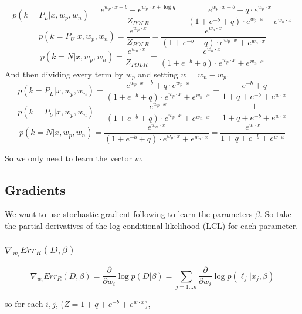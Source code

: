 \documentclass{article}
\begin{document}
$$
p(k=P_L | x, w_p, w_n) =  \frac{e^{w_p \cdot x - b} + e^{w_p \cdot x + \log{q}}}{Z_{POLR}} 
				     = \frac{e^{w_p \cdot x - b} + q \cdot e^{w_p \cdot x}}{(1 + e^{-b} + q) \cdot e^{w_p \cdot x} + e^{w_n \cdot x}} 
$$
$$
p(k=P_U | x, w_p, w_n) =  \frac{e^{w_p \cdot x}}{Z_{POLR}} 
				     = \frac{e^{w_p \cdot x}}{(1 + e^{-b} + q) \cdot e^{w_p \cdot x} + e^{w_n \cdot x}} 
$$
$$
p(k=N | x, w_p, w_n) =  \frac{e^{w_n \cdot x}}{Z_{POLR}} 
				 = \frac{e^{w_n \cdot x}}{(1 + e^{-b} + q) \cdot e^{w_p \cdot x} + e^{w_n \cdot x}} 
$$
And then dividing every term by $w_p$ and setting $w = w_n - w_p$.
$$
p(k=P_L | x, w_p, w_n) = \frac{e^{w_p \cdot x - b} + q \cdot e^{w_p \cdot x}}{(1 + e^{-b} + q) \cdot e^{w_p \cdot x} + e^{w_n \cdot x}} 
 				     = \frac{e^{-b} + q}{1 + q + e^{-b} + e^{w \cdot x}}
$$
$$
p(k=P_U | x, w_p, w_n) = \frac{e^{w_p \cdot x}}{(1 + e^{-b} + q) \cdot e^{w_p \cdot x} + e^{w_n \cdot x}} 
				     = \frac{1}{1 + q + e^{-b} + e^{w \cdot x}}
$$
$$
p(k=N | x, w_p, w_n) = \frac{e^{w_n \cdot x}}{(1 + e^{-b} + q) \cdot e^{w_p \cdot x} + e^{w_n \cdot x}} 
				= \frac{e^{w \cdot x}}{1 + q + e^{-b} + e^{w \cdot x}}
$$


So we only need to learn the vector $w$.

\subsection{Gradients}

We want to use stochastic gradient following to learn the parameters $\beta$. So take the partial derivatives of the log conditional likelihood (LCL) for each parameter.

\subsubsection{$ \nabla_{w_i}{Err_R (D, \beta)}$}

$$
\nabla_{w_i}{Err_R (D, \beta)} = \frac{\partial}{\partial w_i} \log{p(D|\beta)} =  \sum_{j=1...n}{\frac{\partial}{\partial w_i}\log{p(\ell_j | x_j, \beta)}}
$$

so for each $i,j$, ($Z = 1 + q + e^{-b} + e^{w \cdot x}$),
\end{document}
